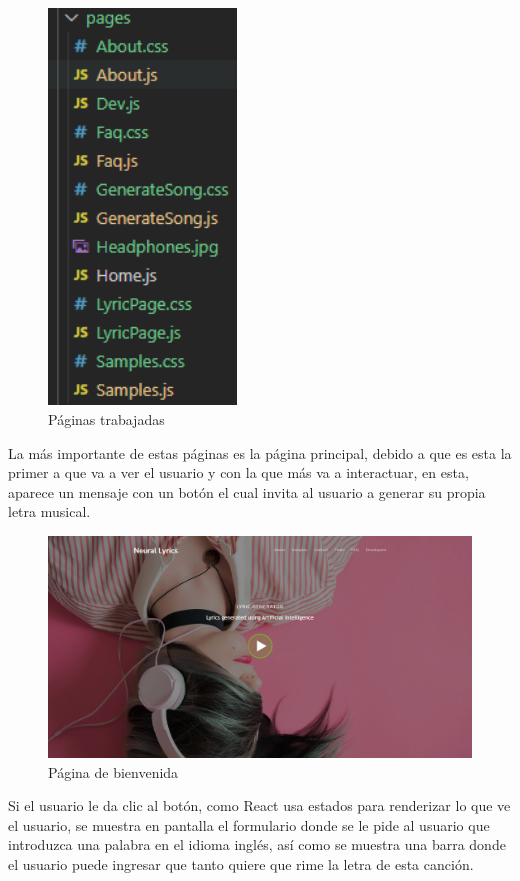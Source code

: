 \documentclass[12pt, a4paper, titlepage]{article}
\begin{document}
	\begin{figure}[H]
		\includegraphics[width=5cm]{./Imagenes/AplicacionWeb/Paginas.png}
		\centering 
		\caption{Páginas trabajadas}
	\end{figure}
	La más importante de estas páginas es la página principal, debido a que es esta la primer a que va a ver el usuario y con la que más va a interactuar, en esta, aparece un mensaje con un botón el cual invita al usuario a generar su propia letra musical.
	\begin{figure}[H]
		\includegraphics[width=13.5cm]{./Imagenes/AplicacionWeb/Paginaweb.png}
		\centering 
		\caption{Página de bienvenida}
	\end{figure}
	Si el usuario le da clic al botón, como React usa estados para renderizar lo que ve el usuario, se muestra en pantalla el formulario donde se le pide al usuario que introduzca una palabra en el idioma inglés, así como se muestra una barra donde el usuario puede ingresar que tanto quiere que rime la letra de esta canción.
\end{document}
